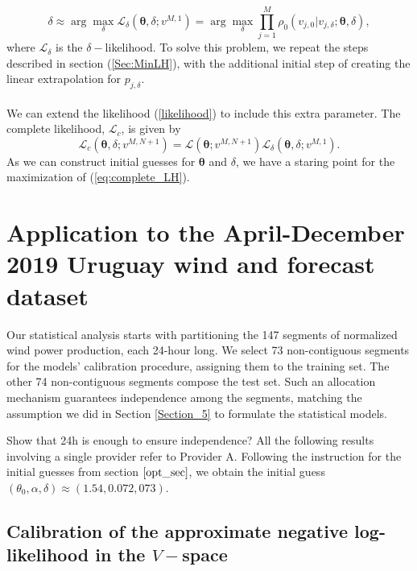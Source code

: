 \documentclass[11pt]{article}
\theoremstyle{definition}
\begin{document}
\begin{equation}
\delta\approx\arg\max_{\delta}\mathcal{L}_{\delta}\left(\bm{\theta},\delta; v^{M,1}\right) = \arg\max_{\delta}\prod\limits_{j=1}^M \rho_0 \left(v_{j, 0}|v_{j,\delta};\bm{\theta},\delta\right),
\label{eq:likelihood_delta}
\end{equation}
where $\mathcal{L}_\delta$ is the $\delta-$likelihood. To solve this problem, we repeat the steps described in section (\ref{Sec:MinLH}), with the additional initial step of creating the linear extrapolation for $p_{j,\delta}$.\\
\quad\\
We can extend the likelihood (\ref{likelihood}) to include this extra parameter. The complete likelihood, $\mathcal{L}_c$, is given by
\begin{equation}
\mathcal{L}_c\left(\bm{\theta},\delta; v^{M,N +1}\right)=\mathcal{L}\left(\bm{\theta}; v^{M,N +1}\right)\mathcal{L}_{\delta}\left(\bm{\theta},\delta; v^{M,1}\right).
\label{eq:complete_LH}
\end{equation}
As we can construct initial guesses for $\bm{\theta}$ and $\delta$, we have a staring point for the maximization of (\ref{eq:complete_LH}).



\section{Application to the April-December 2019 Uruguay wind and forecast dataset} \label{Section_6}

Our statistical analysis starts with partitioning the 147 segments of normalized wind power production, each 24-hour long. We select 73 non-contiguous segments for the models' calibration procedure, assigning them to the training set. The other 74 non-contiguous segments compose the test set. Such an allocation mechanism guarantees independence among the segments, matching the assumption we did in Section \ref{Section_5} to formulate the statistical models.

{ \color{red} Show that 24h is enough to ensure independence?}
All the following results involving a single provider refer to Provider A. Following the instruction for the initial guesses from section $\ref{opt_sec}$, we obtain the initial guess $(\theta_0,\alpha,\delta)\approx(1.54,0.072,073)$.

\subsection{Calibration of the approximate negative log-likelihood in the $V-$space}
\end{document}
